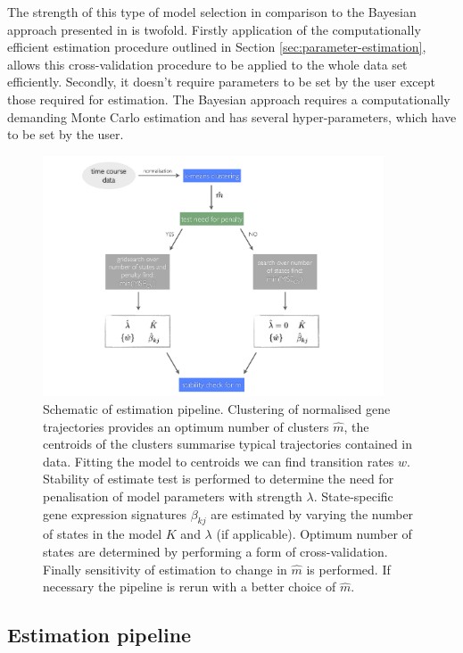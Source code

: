 The strength of this type of model selection in comparison to the Bayesian approach presented in \cite{Armond:2013} is twofold. Firstly application of the computationally efficient estimation procedure outlined in Section \ref{sec:parameter-estimation}, allows this cross-validation procedure to be applied to the whole data set efficiently. Secondly, it doesn't require parameters to be set by the user except those required for estimation. The Bayesian approach requires a computationally demanding Monte Carlo estimation and has several hyper-parameters, which have to be set by the user.

\begin{figure}
  \centering
  \includegraphics[width=0.9\textwidth]{pics/pipeline.pdf}
  \caption{Schematic of estimation pipeline. Clustering of normalised gene trajectories provides an optimum number of clusters $\hat{m}$, the centroids of the clusters summarise typical trajectories contained in data. Fitting the model to centroids we can find transition rates $w$. Stability of estimate test is performed to determine the need for penalisation of model parameters with strength $\lambda$. State-specific gene expression signatures $\beta_{kj}$ are estimated by varying the number of states in the model $K$ and $\lambda$ (if applicable). Optimum number of states are determined by performing a form of cross-validation. Finally sensitivity of estimation to change in $\hat{m}$ is performed. If necessary the pipeline is rerun with a better choice of $\hat{m}$.}
  \label{fig:pipeline}
\end{figure}

\subsection{Estimation pipeline}
\label{sec:estim-pipe}

